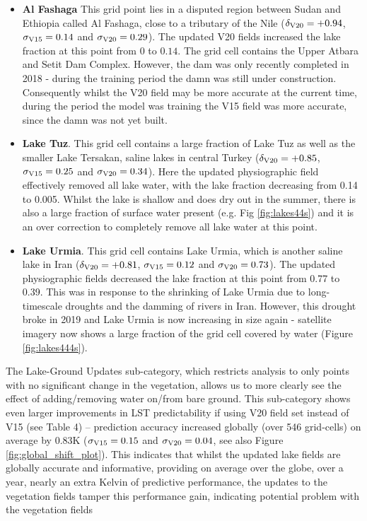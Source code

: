 \documentclass[hess, twostagejnl]{copernicus}
\begin{document}
\begin{itemize}
	\item \textbf{Al Fashaga} This grid point lies in a disputed region between Sudan and Ethiopia called Al Fashaga, close to a tributary of the Nile ($\delta_{\rm V20} = +0.94$, $\sigma_{\rm V15} = 0.14$ and $\sigma_{\rm V20}=0.29$). The updated V20 fields increased the lake fraction at this point from $0$ to $0.14$. The grid cell contains the Upper Atbara and Setit Dam Complex. However, the dam was only recently completed in 2018 - during the training period the damn was still under construction. Consequently whilst the V20 field may be more accurate at the current time, during the period the model was training the V15 field was more accurate, since the damn was not yet built. 
		
	\item \textbf{Lake Tuz}. This grid cell contains a large fraction of Lake Tuz as well as the smaller Lake Tersakan, saline lakes in central Turkey ($\delta_{\rm V20} = +0.85$,$\sigma_{\rm V15} = 0.25$ and $\sigma_{\rm V20}=0.34$). Here the updated physiographic field effectively removed all lake water, with the lake fraction decreasing from 0.14 to 0.005. Whilst the lake is shallow and does dry out in the summer, there is also a large fraction of surface water present (e.g. Fig \ref{fig:lakes44s}) and it is an over correction to completely remove all lake water at this point.
	
	\item \textbf{Lake Urmia}. This grid cell contains Lake Urmia, which is another saline lake in Iran ($\delta_{\rm V20} = +0.81$, $\sigma_{\rm V15} = 0.12$ and $\sigma_{\rm V20}=0.73$). The updated physiographic fields decreased the lake fraction at this point from 0.77 to 0.39. This was in response to the shrinking of Lake Urmia due to long-timescale droughts and the damming of rivers in Iran. However, this drought broke in 2019 and Lake Urmia is now increasing in size again - satellite imagery now shows a large fraction of the grid cell covered by water (Figure \ref{fig:lakes444s}).
\end{itemize}

\noindent The Lake-Ground Updates sub-category, which restricts analysis to only points with no significant change in the vegetation, allows us to more clearly see the effect of adding/removing water on/from bare ground. This sub-category shows even larger improvements in LST predictability if using V20 field set instead of V15 (see Table 4) – prediction accuracy increased globally (over 546 grid-cells) on average by 0.83K ($\sigma_{\rm V15} = 0.15$ and $\sigma_{\rm V20}=0.04$, see also Figure \ref{fig:global_shift_plot}). This indicates that whilst the updated lake fields are globally accurate and informative, providing on average over the globe, over a year, nearly an extra Kelvin of predictive performance, the updates to the vegetation fields tamper this performance gain, indicating potential problem with the vegetation fields
\end{document}
